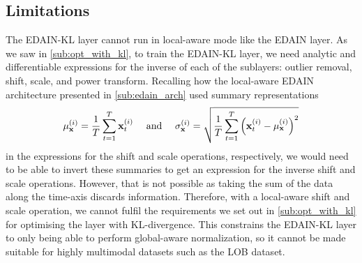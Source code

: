 \documentclass{statsmsc}
\begin{document}
{\subsection{Limitations}%
\label{sub:Limitations}

The \ac{EDAIN-KL} layer cannot run in local-aware mode like the \ac{EDAIN} layer.
As we saw in \cref{sub:opt_with_kl}, to train the \ac{EDAIN-KL} layer, we need analytic and
differentiable expressions for the inverse of each of the sublayers: outlier removal, shift,
scale, and power transform. Recalling how the local-aware \ac{EDAIN} architecture presented
in \cref{sub:edain_arch} used summary representations
\begin{equation}
    \mu_{\mathbf{x}}^{(i)}=\frac{1}{T} \sum^{T}_{t=1} \mathbf{x}^{(i)}_t  \quad\textrm{ and }\quad
    \sigma_{\mathbf{x}}^{(i)}=\sqrt{\frac{1}{T}  \sum^{T}_{t=1} \left(\mathbf{x}^{(i)}_t- \mu_{\mathbf{x}}^{(i)} \right)^2}
\end{equation}
in the expressions for the shift and scale operations, respectively, we would need to be able to
invert these summaries to get an expression for the inverse shift and scale operations. However,
that is not possible as taking the sum of the data along the time-axis discards information.
Therefore, with a local-aware shift and scale operation, we cannot fulfil the requirements
we set out in \cref{sub:opt_with_kl} for optimising the layer with \ac{KL-divergence}.
This constrains the \ac{EDAIN-KL} layer to only being able to perform global-aware normalization,
so it cannot be made suitable for highly multimodal datasets such as the \ac{LOB} dataset.

%

}
\end{document}
